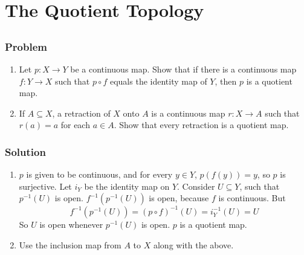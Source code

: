 \setcounter{section}{20} %
\section{The Quotient Topology}
\label{sec-topspace-quotient}
 

\setcounter{subsection}{1} %
\subsection{}

\subsubsection{Problem}
\begin{enumerate}
\item Let $p : X \to Y$ be a continuous map. Show that if there is a continuous map $f : Y \to X$ such that $p \circ f$ equals the identity map of $Y$, then $p$ is a quotient map.
\item If $ A \subseteq X$, a retraction of $X$ onto $A$ is a continuous map $r : X \to A$ such that $r(a) = a$ for each $a \in A$. Show that every retraction is a quotient map.
\end{enumerate}

\subsubsection{Solution}
\begin{enumerate}
\item $p$ is given to be continuous, and for every $y \in Y$, $p(f(y)) = y$, so $p$ is surjective. Let $i_Y$ be the identity map on $Y$. Consider $U \subseteq Y$, such that $p^{-1}(U)$ is open. $f^{-1}(p^{-1}(U))$ is open, because $f$ is continuous. But
\[f^{-1}(p^{-1}(U)) = (p \circ f)^{-1}(U) = i_Y^{-1}(U) = U\]
So $U$ is open whenever $p^{-1}(U)$ is open. $p$ is a quotient map.
\item Use the inclusion map from $A$ to $X$ along with the above.
\end{enumerate}


\setcounter{subsection}{2} %
\subsection{}

